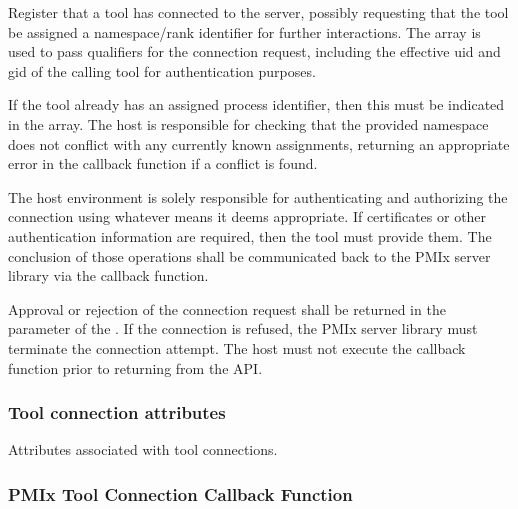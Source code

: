 \optattrend

\descr

Register that a tool has connected to the server, possibly requesting that the
tool be assigned a namespace/rank identifier for further interactions.
The  array is used to pass qualifiers for the
connection request, including the effective uid and gid of the calling tool
for authentication purposes.

If the tool already has an assigned process identifier, then this must be
indicated in the  array. The host is responsible for checking
that the provided namespace does not conflict with any currently known
assignments, returning an appropriate error in the callback function if a conflict is found.

The host environment is solely responsible for authenticating and authorizing
the connection using whatever means it deems appropriate. If certificates or
other authentication information are required, then the tool must provide them.
The conclusion of those operations shall be communicated back to the \ac{PMIx}
server library via the callback function.

Approval or rejection of the connection request shall be returned in the
 parameter of the . If
the connection is refused, the \ac{PMIx} server library must terminate the
connection attempt. The host must not execute the callback function prior to
returning from the \ac{API}.

\subsubsection{Tool connection attributes}

Attributes associated with tool connections.

%
%
%

\subsubsection{PMIx Tool Connection Callback Function}

